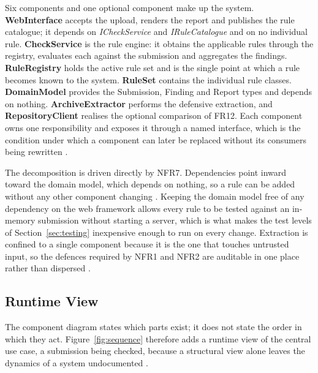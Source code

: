 \documentclass[a4paper,11pt]{article}
\begin{document}
Six components and one optional component make up the system. \textbf{WebInterface}
accepts the upload, renders the report and publishes the rule catalogue; it
depends on \textit{ICheckService} and \textit{IRuleCatalogue} and on no
individual rule. \textbf{CheckService} is the rule engine: it obtains the
applicable rules through the registry, evaluates each against the submission and
aggregates the findings. \textbf{RuleRegistry} holds the active rule set and is
the single point at which a rule becomes known to the system.
\textbf{RuleSet} contains the individual rule classes. \textbf{DomainModel}
provides the Submission, Finding and Report types and depends on nothing.
\textbf{ArchiveExtractor} performs the defensive extraction, and
\textbf{RepositoryClient} realises the optional comparison of FR12. Each
component owns one responsibility and exposes it through a named interface,
which is the condition under which a component can later be replaced without its
consumers being rewritten \citep{Newman2021}.

The decomposition is driven directly by NFR7. Dependencies point inward toward
the domain model, which depends on nothing, so a rule can be added without any
other component changing \citep{Percival2020}. Keeping the domain model free of
any dependency on the web framework allows every rule to be tested against an
in-memory submission without starting a server, which is what makes the test
levels of Section~\ref{sec:testing} inexpensive enough to run on every change.
Extraction is confined to a single component because it is the one that touches
untrusted input, so the defences required by NFR1 and NFR2 are auditable in one
place rather than dispersed \citep{Newman2021}.

\subsection{Runtime View}\label{subsec:runtime}

The component diagram states which parts exist; it does not state the order in
which they act. Figure~\ref{fig:sequence} therefore adds a runtime view of the
central use case, a submission being checked, because a structural view alone
leaves the dynamics of a system undocumented \citep{Bass2021}.
\end{document}
